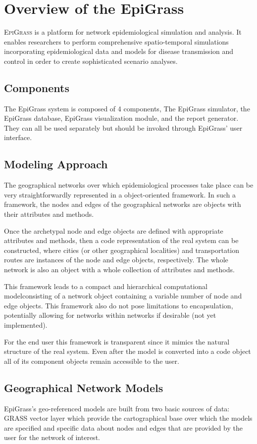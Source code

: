 \chapter{Overview of the EpiGrass}
\label{ch:overview}
\lettrine{E}{piGrass} is a platform for network epidemiological simulation and analysis. It enables researchers to perform comprehensive spatio-temporal simulations incorporating epidemiological data and models for disease transmission and control in order to create sophisticated scenario analyses.

\section{Components}
The EpiGrass system is composed of 4 components, The EpiGrass simulator, the EpiGrass database, EpiGrass visualization module, and the report generator. They can all be used separately but should be invoked through EpiGrass' user interface.


\section{Modeling Approach} 
The geographical networks  over which epidemiological processes take place can be very straightforwardly represented in a object-oriented framework. In such a framework, the nodes and edges of the geographical networks are objects with their attributes and methods. 

Once the archetypal node and edge objects are defined with appropriate attributes and methods, then a code representation of the real system can be constructed, where cities (or other geographical localities) and transportation routes are instances of the node and edge objects, respectively. The whole network is also an object with a whole collection of attributes and methods.

This framework leads to a compact and hierarchical computational modelconsisting of a network object containing a variable number of node and edge objects. This framework also do not pose limitations to encapsulation, potentially allowing for networks within networks if desirable (not yet implemented).

For the end user this framework is transparent since it mimics the natural structure of the real system. Even after the model is converted into a code object all of its component objects remain accessible to the user.

\section{Geographical Network Models}
EpiGrass's geo-referenced models are built from two basic sources of data: GRASS vector layer which provide the cartographical base over which the models are specified and specific data about nodes and edges that are provided by the user for the network of interest.

